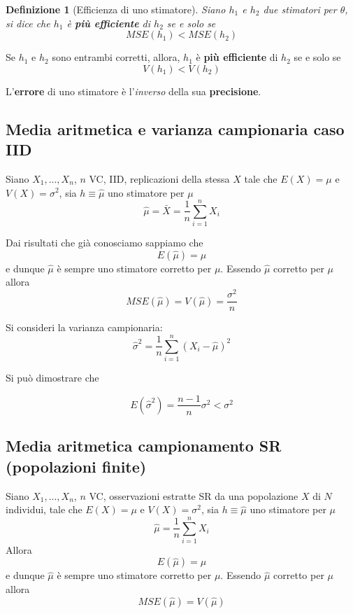 \documentclass[
  11pt,
]{book}
\theoremstyle{mytheoremstyle}
\theoremstyle{mydefstyle}
\newtheorem{definition}{Definizione}[section]
\newenvironment{nota}
  {
\begin{tcolorbox}[enhanced,breakable,arc=0.1mm,boxrule=1pt,colback=white,colframe=iblue,title=\bf \fontfamily{lmss}\selectfont \faInfoCircle \hspace{.5 cm} Nota,drop fuzzy shadow]
}{
\end{tcolorbox}
  }
\begin{document}
\begin{info}

\begin{definition}[Efficienza di uno stimatore]
Siano \(h_1\) e \(h_2\) due stimatori per \(\theta\), si dice che \(h_1\) è \textbf{più efficiente} di \(h_2\) se e solo se
\[MSE(h_1)<MSE(h_2)\]
\end{definition}

\end{info}

\begin{nota}
Se \(h_1\) e \(h_2\) sono entrambi corretti, allora, \(h_1\) è \textbf{più efficiente} di \(h_2\) se e solo se
\[V(h_1)<V(h_2)\]

L'\textbf{errore} di uno stimatore è l'\emph{inverso} della sua \textbf{precisione}.

\end{nota}

\subsection{Media aritmetica e varianza campionaria caso IID}\label{media-aritmetica-e-varianza-campionaria-caso-iid}

Siano \(X_1,...,X_n\), \(n\) VC, IID, replicazioni della stessa \(X\) tale che \(E(X)=\mu\) e \(V(X)=\sigma^2\), sia \(h\equiv\hat \mu\) uno stimatore per \(\mu\)
\[
\hat \mu=\bar X=\frac 1 n \sum_{i=1}^n X_i
\]

Dai risultati che già conosciamo sappiamo che
\[
E(\hat \mu)=\mu
\]
e dunque \(\hat \mu\) è sempre uno stimatore corretto per \(\mu\).
Essendo \(\hat \mu\) corretto per \(\mu\) allora
\[MSE(\hat \mu)=V(\hat \mu)=\frac{\sigma^2}n\]

Si consideri la varianza campionaria:
\[
\hat\sigma^2=\frac 1 n \sum_{i=1}^n(X_i-\hat \mu)^2
\]

Si può dimostrare che

\begin{info}
\[
E(\hat \sigma^2)=\frac {n-1}n \sigma^2<\sigma^2
\]

\end{info}

\subsection{Media aritmetica campionamento SR (popolazioni finite)}\label{media-aritmetica-campionamento-sr-popolazioni-finite}

Siano \(X_1,...,X_n\), \(n\) VC, osservazioni estratte SR da una popolazione \(X\) di \(N\) individui, tale che \(E(X)=\mu\) e \(V(X)=\sigma^2\), sia \(h\equiv\hat \mu\) uno stimatore per \(\mu\)
\[
\hat \mu=\frac 1 n \sum_{i=1}^n X_i
\]
Allora
\[
E(\hat \mu)=\mu
\]
e dunque \(\hat \mu\) è sempre uno stimatore corretto per \(\mu\).
Essendo \(\hat \mu\) corretto per \(\mu\) allora
\[MSE(\hat \mu)=V(\hat \mu)\]
\end{document}
